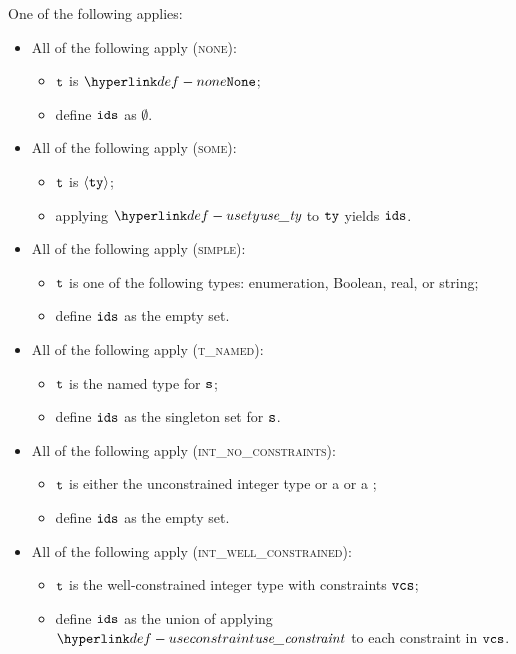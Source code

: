 \ProseParagraph
One of the following applies:
\begin{itemize}
  \item All of the following apply (\textsc{none}):
  \begin{itemize}
    \item $\texttt{t}$ is $\None$;
    \item define $\texttt{ids}$ as $\emptyset$.
  \end{itemize}

  \item All of the following apply (\textsc{some}):
  \begin{itemize}
    \item $\texttt{t}$ is $\langle\texttt{ty}\rangle$;
    \item applying $\usety$ to $\texttt{ty}$ yields $\texttt{ids}$.
  \end{itemize}

  \item All of the following apply (\textsc{simple}):
  \begin{itemize}
    \item $\texttt{t}$ is one of the following types: enumeration, Boolean, real, or string;
    \item define $\texttt{ids}$ as the empty set.
  \end{itemize}

  \item All of the following apply (\textsc{t\_named}):
  \begin{itemize}
    \item $\texttt{t}$ is the named type for $\texttt{s}$;
    \item define $\texttt{ids}$ as the singleton set for $\texttt{s}$.
  \end{itemize}

  \item All of the following apply (\textsc{int\_no\_constraints}):
  \begin{itemize}
    \item $\texttt{t}$ is either the unconstrained integer type or a \parameterizedintegertype{} or a \pendingconstrainedintegertype;
    \item define $\texttt{ids}$ as the empty set.
  \end{itemize}

  \item All of the following apply (\textsc{int\_well\_constrained}):
  \begin{itemize}
    \item $\texttt{t}$ is the well-constrained integer type with constraints $\texttt{vcs}$;
    \item define $\texttt{ids}$ as the union of applying $\useconstraint$ to each constraint in $\texttt{vcs}$.
  \end{itemize}


\end{itemize}

